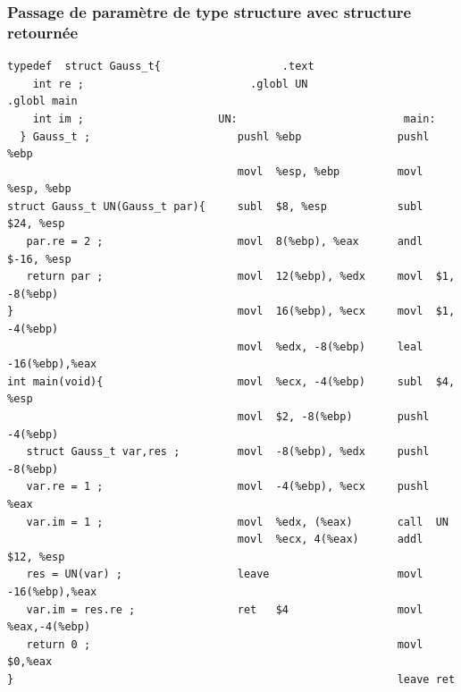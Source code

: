 \begin{frame}
  \frametitle{Passage de param\`etre de type structure avec structure retourn\'ee}%
\begin{verbatim}
typedef  struct Gauss_t{                   .text                 
    int re ;                          .globl UN                      .globl main   
    int im ;                     UN:                          main:           
  } Gauss_t ;                       pushl %ebp               pushl %ebp            
                                    movl  %esp, %ebp         movl  %esp, %ebp  
struct Gauss_t UN(Gauss_t par){     subl  $8, %esp           subl  $24, %esp   
   par.re = 2 ;                     movl  8(%ebp), %eax      andl  $-16, %esp  
   return par ;                     movl  12(%ebp), %edx     movl  $1, -8(%ebp)
}                                   movl  16(%ebp), %ecx     movl  $1, -4(%ebp)
                                    movl  %edx, -8(%ebp)     leal  -16(%ebp),%eax       
int main(void){                     movl  %ecx, -4(%ebp)     subl  $4, %esp    
                                    movl  $2, -8(%ebp)       pushl -4(%ebp)    
   struct Gauss_t var,res ;         movl  -8(%ebp), %edx     pushl -8(%ebp)    
   var.re = 1 ;                     movl  -4(%ebp), %ecx     pushl %eax               
   var.im = 1 ;                     movl  %edx, (%eax)       call  UN                                            
                                    movl  %ecx, 4(%eax)      addl  $12, %esp   
   res = UN(var) ;                  leave                    movl -16(%ebp),%eax
   var.im = res.re ;                ret   $4                 movl %eax,-4(%ebp)
   return 0 ;                                                movl  $0,%eax
}                                                            leave ret
 \end{verbatim}
\end{frame}

\begin{frame}
  \section{}%
\end{frame}
